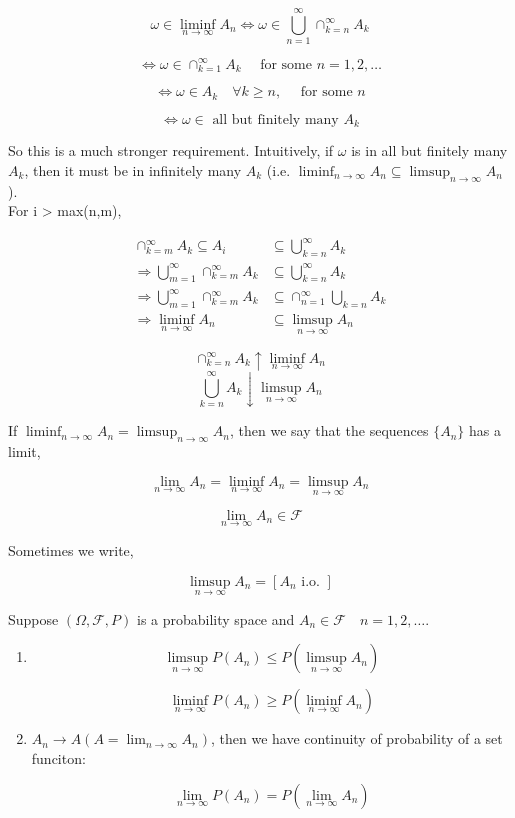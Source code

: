 \documentclass[11pt,fleqn]{book} %
\begin{document}
$$\omega \in \liminf_{n \rightarrow \infty} A_n \Leftrightarrow \omega \in \bigcup^\infty_{n=1} \cap^\infty_{k=n} A_k $$

$$ \Leftrightarrow \omega \in \cap^\infty_{k=1} A_k \quad \text{ for some } n=1, 2, \dots$$

$$\Leftrightarrow \omega \in A_k \quad \forall k\geq n, \quad \text{ for some } n $$

$$\Leftrightarrow \omega \in \text{ all but finitely many } A_k $$

So this is a much stronger requirement. Intuitively, if $\omega$ is in all but finitely many $A_k$, then it must be in infinitely many $A_k$ (i.e. $\liminf_{n \rightarrow \infty} A_n \subseteq \limsup_{n\rightarrow \infty} A_n$).\\ 


	For i > max(n,m), 

	\begin{align*}
		\cap_{k=m}^\infty A_k \subseteq A_i &\subseteq \bigcup_{k=n}^\infty A_k\\
		\Rightarrow \bigcup^\infty_{m=1}\cap^\infty_{k=m} A_k &\subseteq \bigcup_{k=n}^\infty A_k\\
		\Rightarrow \bigcup^\infty_{m=1}\cap^\infty_{k=m} A_k &\subseteq \cap^\infty_{n=1}\bigcup_{k=n} A_k\\
		\Rightarrow \liminf_{n \rightarrow \infty} A_n &\subseteq \limsup_{n \rightarrow \infty} A_n
	\end{align*}
	 
	 $$\cap^\infty_{k=n}A_k \uparrow \liminf_{n \rightarrow \infty} A_n $$
	 $$\bigcup^\infty_{k=n}A_k \downarrow \limsup_{n \rightarrow \infty} A_n $$

	 If $\liminf_{n \rightarrow \infty} A_n = \limsup_{n \rightarrow \infty} A_n$, then we say that the sequences $\{A_n\}$ has a limit, 

	 $$\lim_{n \rightarrow \infty} A_n = \liminf_{n \rightarrow \infty} A_n = \limsup_{n \rightarrow \infty} A_n $$

	 $$ \lim_{n \rightarrow \infty} A_n \in \mathcal{F}$$

	 Sometimes we write, 

	 $$ \limsup_{n \rightarrow \infty} A_n = [A_n \text{ i.o. }] $$

	 \begin{theorem}
	 	Suppose $(\Omega, \mathcal{F}, P)$ is a probability space and $A_n \in \mathcal{F} 	\quad n= 1, 2, \dots$.

	 	\begin{enumerate}[label = (\roman*)]
	 	 	\item $$\limsup_{n \rightarrow \infty} P( A_n) \leq P(\limsup_{n \rightarrow \infty} A_n) $$

	 	 	$$ \liminf_{n \rightarrow \infty} P( A_n) \geq P(\liminf_{n \rightarrow \infty} A_n)$$

	 	 	\item $A_n \rightarrow A (A = \lim_{n \rightarrow \infty} A_n)$, then we have continuity of probability of a set funciton: 

	 	 	$$\lim_{n \rightarrow \infty} P(A_n) = P (\lim_{n \rightarrow \infty} A_n) $$
	 	 \end{enumerate} 
	 \end{theorem}
\end{document}

